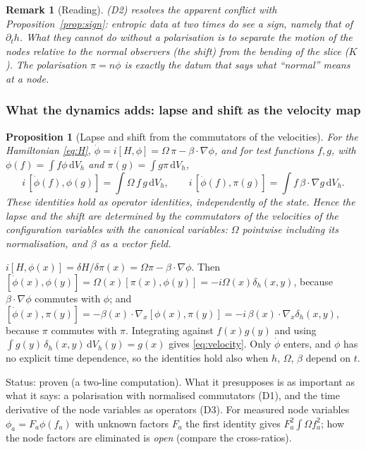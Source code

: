 \documentclass[11pt,a4paper]{article}
\makeatletter
\theoremstyle{stmt}
\newtheorem{proposition}[theorem]{Proposition}
\theoremstyle{defn}
\theoremstyle{rmk}
\newtheorem{remark}[theorem]{Remark}
\renewenvironment{proof}[1][\proofname]{\par\pushQED{\qed}\normalfont\topsep6\p@\@plus6\p@\relax
  \trivlist\item[\hskip\labelsep{\sffamily\itshape\small #1.}]\ignorespaces}{\popQED\endtrivlist\@endpefalse}
\numberwithin{equation}{section}
\newcommand{\status}[1]{\par\noindent\textsf{\small Status: #1}\par}
\newcommand{\dd}{\mathrm{d}}
\makeatother
\begin{document}
{\begin{remark}[Reading]
\textup{(D2)} resolves the apparent conflict with Proposition~\ref{prop:sign}: entropic data at \emph{two} times do see a sign, namely that of $\partial_th$. What they cannot do without a polarisation is to separate the motion of the nodes relative to the normal observers (the shift) from the bending of the slice ($K$). The polarisation $\pi=n\phi$ is exactly the datum that says what ``normal'' means at a node.
\end{remark}

\subsubsection{What the dynamics adds: lapse and shift as the velocity map}

\begin{proposition}[Lapse and shift from the commutators of the velocities]\label{prop:velocity}
For the Hamiltonian \eqref{eq:H}, $\dot\phi=i[H,\phi]=\Omega\,\pi-\beta\cdot\nabla\phi$, and for test functions $f,g$, with $\phi(f)=\int f\phi\,\dd V_h$ and $\pi(g)=\int g\pi\,\dd V_h$,
\begin{equation}\label{eq:velocity}
i\,[\dot\phi(f),\phi(g)]=\int\Omega\,f\,g\,\dd V_h,\qquad i\,[\dot\phi(f),\pi(g)]=\int f\,\beta\cdot\nabla g\,\dd V_h .
\end{equation}
These identities hold as operator identities, independently of the state. Hence the lapse and the shift are determined by the commutators of the velocities of the configuration variables with the canonical variables: $\Omega$ pointwise including its normalisation, and $\beta$ as a vector field.
\end{proposition}

\begin{proof}
$i[H,\phi(x)]=\delta H/\delta\pi(x)=\Omega\pi-\beta\cdot\nabla\phi$. Then $[\dot\phi(x),\phi(y)]=\Omega(x)[\pi(x),\phi(y)]=-i\Omega(x)\delta_h(x,y)$, because $\beta\cdot\nabla\phi$ commutes with $\phi$; and $[\dot\phi(x),\pi(y)]=-\beta(x)\cdot\nabla_x[\phi(x),\pi(y)]=-i\,\beta(x)\cdot\nabla_x\delta_h(x,y)$, because $\pi$ commutes with $\pi$. Integrating against $f(x)g(y)$ and using $\int g(y)\,\delta_h(x,y)\,\dd V_h(y)=g(x)$ gives \eqref{eq:velocity}. Only $\dot\phi$ enters, and $\phi$ has no explicit time dependence, so the identities hold also when $h$, $\Omega$, $\beta$ depend on $t$.
\end{proof}
\status{proven (a two-line computation). What it presupposes is as important as what it says: a polarisation with normalised commutators (D1), and the time derivative of the node variables as operators (D3). For measured node variables $\phi_a=F_a\phi(f_a)$ with unknown factors $F_a$ the first identity gives $F_a^2\int\Omega f_a^2$; how the node factors are eliminated is \emph{open} (compare the cross-ratios).}

}
\end{document}
